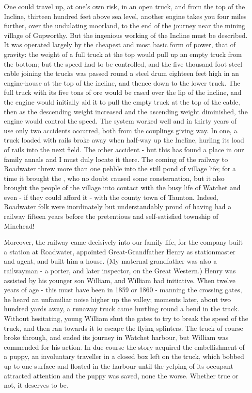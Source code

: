 One could travel up, at one's own risk, in an open truck, and from the top of the Incline, thirteen hundred feet above sea level, another engine takes you four miles further, over the undulating moorland, to the end of the journey near the mining village of Gupworthy. But the ingenious working of the Incline must be described. It was operated largely by the cheapest and most basic form of power, that of gravity: the weight of a full truck at the top would pull up an empty truck from the bottom; but the speed had to be controlled, and the five thousand foot steel cable joining the trucks was passed round a steel drum eighteen feet high in an engine-house at the top of the incline, and thence down to the lower truck. The full truck with its five tons of ore would be cased over the lip of the incline, and the engine would initially aid it to pull the empty truck at the top of the cable, then as the descending weight increased and the ascending weight diminished, the engine would control the speed. The system worked well and in thirty years of use only two accidents occurred, both from the couplings giving way. In one, a truck loaded with rails broke away when half-way up the Incline, hurling its load of rails into the next field. The other accident - but this has found a place in our family annals and I must duly locate it there.
The coming of the railway to Roadwater threw more than one pebble into the still pond of village life; for a time it brought the , who no doubt caused some consternation, but it also brought the people of the village into contact with the busy life of Watchet and even - if they could afford it - with the county town of Taunton. Indeed, Roadwater folk were inordinately but understandably proud of having had a railway fifteen years before the pretentious and self-satisfied township of Minehead!

Moreover, the railway came decisively into our family life, for the company built a station at Roadwater, appointed Great-Grandfather Henry as stationmaster and agent, and built him a house. (My maternal grandfather was also a railwayman - a porter, and later inspector, on the Great Western.) Henry was assisted by his younger son William, and William had initiative. When twelve years of age - this must have been in 1859 or 1860 - manning the crossing gates, he heard an unfamiliar noise higher up the valley; moments later, about two hundred yards away, a runaway truck came hurtling round a bend in the track. Without hesitating, young William shut the gates to try to break the speed of the truck, and then ran towards it to escape the flying splinters. The truck of course broke through, and ended its journey in Watchet harbour, but William was commended for his action.
In due course the story acquired the embellishment of a puppy, an involuntary traveller in a closed box left on the truck, which bobbed up to one surface and floated in the harbour until the yelping of its occupant attracted attention and the puppy was saved, none the worse. Whether true or not, it deserves to be.

